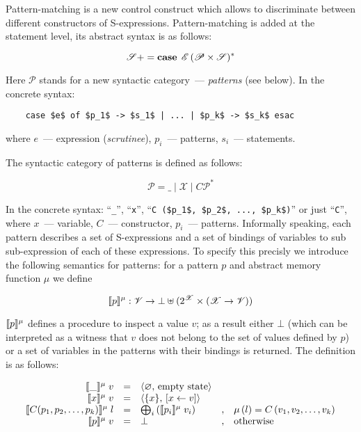 Pattern-matching is a new control construct which allows to discriminate between different constructors of S-expressions. Pattern-matching is added at
the statement level, its abstract syntax is as follows:

\[
\mathscr S += \mathbf{case}\;{\,}\mathscr{E}\,(\mathscr{P}\times\mathscr{S})^*
\]

Here $\mathscr P$ stands for a new syntactic category~--- \emph{patterns} (see below). In the concrete syntax:

\begin{lstlisting}
    case $e$ of $p_1$ -> $s_1$ | ... | $p_k$ -> $s_k$ esac
\end{lstlisting}

where $e$~--- expression (\emph{scrutinee}), $p_i$~--- patterns, $s_i$~--- statements.

The syntactic category of patterns is defined as follows:

\[
\mathscr P = \_ \mid \mathscr X \mid C \mathscr{P}^*
\]

In the concrete syntax: ``\lstinline|_|'', ``\lstinline|x|'', ``\lstinline|C ($p_1$, $p_2$, ..., $p_k$)|'' or just ``\lstinline|C|'',
where $x$~--- variable, $C$~--- constructor, $p_i$~--- patterns. Informally speaking, each pattern describes a
set of S-expressions and a set of bindings of variables to sub sub-expression of each of these expressions. To specify
this precisly we introduce the following semantics for patterns: for a pattern $p$ and abstract memory function $\mu$ we
define

\[
\llbracket{p}\rrbracket^\mu : \mathscr{V}\to\bot\uplus(2^{\mathscr X}\times(\mathscr{X}\to\mathscr{V}))
\]

$\llbracket{p}\rrbracket^\mu$ defines a procedure to inspect a value $v$; as a result either $\bot$ (which can be interpreted as a witness that $v$
does not belong to the set of values defined by $p$) or a set of variables in the patterns with their bindings is returned.
The definition is as follows:

\[
\begin{array}{rclcl}
  \llbracket{\_}\rrbracket^\mu\; v                      &=& \left<{\varnothing,\,\mbox{empty state}}\right> & & \\
  \llbracket{x}\rrbracket^\mu\; v                       &=& \left<{\{x\},\, [x \gets v]}\right> & & \\
  \llbracket{C (p_1, p_2, \dots, p_k)}\rrbracket^\mu\; l &=& \bigoplus_i\,(\llbracket{p_i}\rrbracket^\mu\;v_i) &,& \mu\,(l)=C\,(v_1,v_2,\dots,v_k)\\
  \llbracket{p}\rrbracket^\mu\; v                       &=& \bot &,& \mbox{otherwise}
\end{array}
\]

